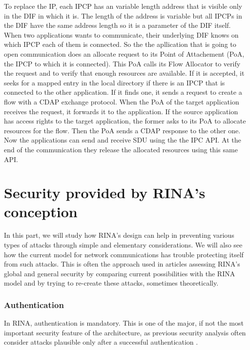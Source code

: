\documentclass[a4paper]{proc}
\begin{document}
To replace the IP, each IPCP has an variable length address that is visible only
in the DIF in which it is.  The length of the address is variable but all IPCPs
in the DIF have the same address length so it is a parameter of the DIF itself.
When two applications wants to communicate, their underlying DIF knows on which
IPCP each of them is connected.  So the the apllication that is going to open
communication does an allocate request to its Point of Attachement (PoA, the
IPCP to which it is connected).  This PoA calls its Flow Allocator to verify the
request and to verify that enough resources are available.  If it is accepted,
it seeks for a mapped entry in the local directory if there is an IPCP that is
connected to the other application.  If it finds one, it sends a request to
create a flow with a CDAP exchange protocol.  When the PoA of the target
application receives the request, it forwards it to the application.  If the
source application has access rights to the target application, the former asks
to its PoA to allocate resources for the flow.  Then the PoA sends a CDAP
response to the other one.  Now the applications can send and receive SDU using
the the IPC API\@.  At the end of the communication they release the allocated
resources using this same API\@.\cite{Trouva2011ISTI}


\part{Security provided by RINA's conception}

In this part, we will study how RINA's design can help in preventing various
types of attacks through simple and elementary considerations. We will also see
how the current model for network communications has trouble protecting itself
from such attacks. This is often the approach used in articles assessing RINA's
global and general security by comparing current possibilities with the RINA
model and by trying to re-create these attacks, sometimes theoretically.

\section{Authentication}

In RINA, authentication is mandatory. This is one of the major, if not the most
important security feature of the architecture, as previous security analysis
often consider attacks plausible only after a successful authentication
\cite{assessing-security, wiki, PINS}.
\end{document}
